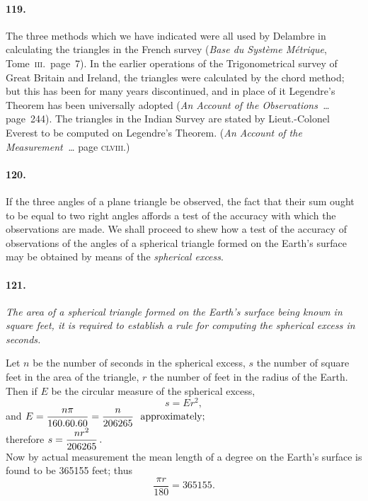 \documentclass{book}[2004/02/16]
\providecommand{\centerdot}{.}
\begin{document}
\begin{mainmatter}
\begin{spacing}{1.3}
\paragraph{119.} The three methods which we have indicated were all
used by Delambre in calculating the triangles in the French
survey (\textit{Base du Syst\`eme M\'etrique}, Tome~\textsc{iii}.\ page~7). In the
earlier operations of the Trigonometrical survey of Great Britain
and Ireland, the triangles were calculated by the chord method;
but this has been for many years discontinued, and in place of it
Legendre's Theorem has been universally adopted (\textit{An Account
of the Observations~\ldots} page~244). The triangles in the Indian
Survey are stated by Lieut.-Colonel Everest to be computed on
Legendre's Theorem. (\textit{An Account of the Measurement~\ldots} page
\textsc{clviii}.)

\paragraph{120.} If the three angles of a plane triangle be observed, the
fact that their sum ought to be equal to two right angles affords a
test of the accuracy with which the observations are made. We
shall proceed to shew how a test of the accuracy of observations of
the angles of a spherical triangle formed on the Earth's surface
may be obtained by means of the \textit{spherical excess}.

\paragraph{121.} \textit{The area of a spherical triangle formed on the Earth's
surface being known in square feet, it is required to establish a rule
for computing the spherical excess in seconds.}

Let $n$ be the number of seconds in the spherical excess, $s$ the
number of square feet in the area of the triangle, $r$ the number of
feet in the radius of the Earth. Then if $E$ be the circular measure
of the spherical excess,
\[
s=Er^2,
\]
and $\hfill\displaystyle
E=\frac{n\pi}{160\centerdot 60\centerdot 60}
= \frac{n}{206265}\ \text{ approximately;}
\hfill$\phantom{and }\\[1.5ex]
therefore $\hfill\displaystyle
s=\frac{nr^2}{206265}\,.
\hfill$\phantom{therefore }\\[1ex]

Now by actual measurement the mean length of a degree on
the Earth's surface is found to be 365155 feet; thus
\[
\frac{\pi r}{180}=365155.
\]


\end{spacing}
\end{mainmatter}
\end{document}
